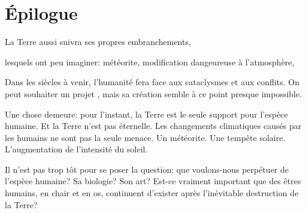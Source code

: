 \chapter*{Épilogue}

La Terre aussi suivra ses propres embranchements, 

lesquels ont peu imaginer: météorite,
modification dangeureuse à l'atmosphère, 

Dans les siècles à venir, l'humanité fera face aux cataclysmes et aux conflits.
On peut souhaiter un projet \nomProjet{}, mais sa création semble à ce point
presque impossible.

Une chose demeure: pour l'instant, la Terre est le seule support pour l'espèce
humaine.  Et la Terre n'est pas éternelle. Les changements climatiques causés
par les humains ne sont pas la seule menace.  Un météorite. Une tempête solaire.
L'augmentation de l'intensité du soleil.

Il n'est pas trop tôt pour se poser la question: que voulons-nous perpétuer de
l'espèce humaine?  Sa biologie? Son art? Est-ce vraiment important que des
êtres humains, en chair et en os, continuent d'exister après l'inévitable
destruction de la Terre?
